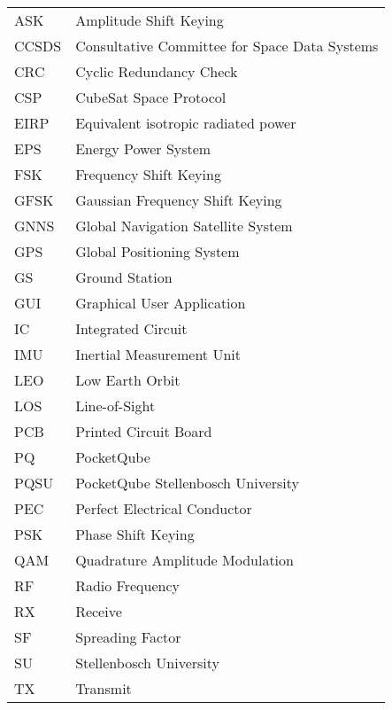 \begin{tabular}{@{}p{2.5cm} l}
    ASK     & Amplitude Shift Keying \\
    CCSDS   & Consultative Committee for Space Data Systems \\
    CRC     & Cyclic Redundancy Check \\
    CSP     & CubeSat Space Protocol \\
    EIRP    & Equivalent isotropic radiated power \\
    EPS     & Energy Power System \\
    FSK     & Frequency Shift Keying \\
    GFSK    & Gaussian Frequency Shift Keying \\
    GNNS    & Global Navigation Satellite System \\ 
    GPS     & Global Positioning System \\
    GS      & Ground Station \\
    GUI     & Graphical User Application \\
    IC      & Integrated Circuit \\
    IMU     & Inertial Measurement Unit \\
    LEO     & Low Earth Orbit \\
    LOS     & Line-of-Sight \\
    PCB     & Printed Circuit Board \\
    PQ      & PocketQube \\
    PQSU    & PocketQube Stellenbosch University \\
    PEC     & Perfect Electrical Conductor \\
    PSK     & Phase Shift Keying \\
    QAM     & Quadrature Amplitude Modulation \\
    RF      & Radio Frequency \\
    RX      & Receive \\
    SF      & Spreading Factor \\
    SU      & Stellenbosch University \\
    TX      & Transmit \\
\end{tabular}
